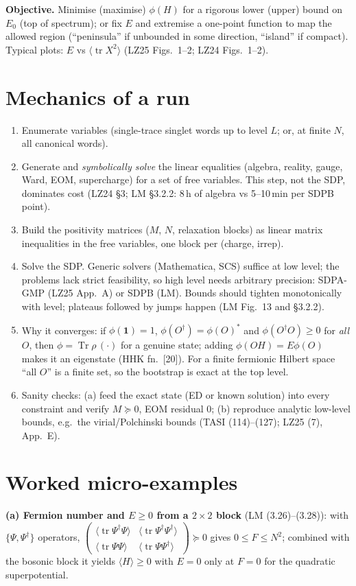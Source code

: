 \documentclass[10pt,a4paper]{article}
\newcommand{\tr}{\operatorname{tr}}
\newcommand{\Tr}{\operatorname{Tr}}
\newcommand{\ev}[1]{\langle #1\rangle}
\begin{document}
\medskip\noindent\textbf{Objective.} Minimise (maximise) $\phi(H)$ for a rigorous lower (upper) bound on $E_0$ (top of spectrum); or fix $E$ and extremise a one-point function to map the allowed region (``peninsula'' if unbounded in some direction, ``island'' if compact). Typical plots: $E$ vs $\ev{\tr X^2}$ (LZ25 Figs.~1--2; LZ24 Figs.~1--2).

\section{Mechanics of a run}
\begin{enumerate}
\item Enumerate variables (single-trace singlet words up to level $L$; or, at finite $N$, all canonical words).
\item Generate and \emph{symbolically solve} the linear equalities (algebra, reality, gauge, Ward, EOM, supercharge) for a set of free variables. This step, not the SDP, dominates cost (LZ24 \S3; LM \S3.2.2: 8\,h of algebra vs 5--10\,min per SDPB point).
\item Build the positivity matrices ($M$, $N$, relaxation blocks) as linear matrix inequalities in the free variables, one block per (charge, irrep).
\item Solve the SDP. Generic solvers (Mathematica, SCS) suffice at low level; the problems lack strict feasibility, so high level needs arbitrary precision: SDPA-GMP (LZ25 App.~A) or SDPB (LM). Bounds should tighten monotonically with level; plateaus followed by jumps happen (LM Fig.~13 and \S3.2.2).
\item Why it converges: if $\phi(\mathbf 1)=1$, $\phi(O^\dagger)=\phi(O)^*$ and $\phi(O^\dagger O)\ge0$ for \emph{all} $O$, then $\phi=\Tr\rho\,(\cdot)$ for a genuine state; adding $\phi(OH)=E\phi(O)$ makes it an eigenstate (HHK fn.\ [20]). For a finite fermionic Hilbert space ``all $O$'' is a finite set, so the bootstrap is exact at the top level.
\item Sanity checks: (a) feed the exact state (ED or known solution) into every constraint and verify $M\succeq0$, EOM residual $0$; (b) reproduce analytic low-level bounds, e.g.\ the virial/Polchinski bounds (TASI (114)--(127); LZ25 (7), App.~E).
\end{enumerate}

\section{Worked micro-examples}
\textbf{(a) Fermion number and $E\ge0$ from a $2\times2$ block} (LM (3.26)--(3.28)): with $\{\Psi,\Psi^\dagger\}$ operators,
$\begin{pmatrix}\ev{\tr\Psi^\dagger\Psi}&\ev{\tr\Psi^\dagger\Psi^\dagger}\\ \ev{\tr\Psi\Psi}&\ev{\tr\Psi\Psi^\dagger}\end{pmatrix}\succeq0$ gives $0\le F\le N^2$; combined with the bosonic block it yields $\ev H\ge0$ with $E=0$ only at $F=0$ for the quadratic superpotential.
\end{document}
